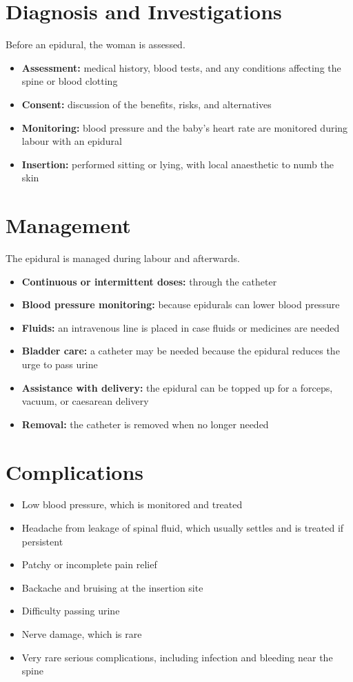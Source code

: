 \section*{Diagnosis and Investigations}
Before an epidural, the woman is assessed.
\begin{itemize}
    \item \textbf{Assessment:} medical history, blood tests, and any conditions affecting the spine or blood clotting
    \item \textbf{Consent:} discussion of the benefits, risks, and alternatives
    \item \textbf{Monitoring:} blood pressure and the baby's heart rate are monitored during labour with an epidural
    \item \textbf{Insertion:} performed sitting or lying, with local anaesthetic to numb the skin
\end{itemize}

\section*{Management}
The epidural is managed during labour and afterwards.
\begin{itemize}
    \item \textbf{Continuous or intermittent doses:} through the catheter
    \item \textbf{Blood pressure monitoring:} because epidurals can lower blood pressure
    \item \textbf{Fluids:} an intravenous line is placed in case fluids or medicines are needed
    \item \textbf{Bladder care:} a catheter may be needed because the epidural reduces the urge to pass urine
    \item \textbf{Assistance with delivery:} the epidural can be topped up for a forceps, vacuum, or caesarean delivery
    \item \textbf{Removal:} the catheter is removed when no longer needed
\end{itemize}

\section*{Complications}
\begin{itemize}
    \item Low blood pressure, which is monitored and treated
    \item Headache from leakage of spinal fluid, which usually settles and is treated if persistent
    \item Patchy or incomplete pain relief
    \item Backache and bruising at the insertion site
    \item Difficulty passing urine
    \item Nerve damage, which is rare
    \item Very rare serious complications, including infection and bleeding near the spine
\end{itemize}

